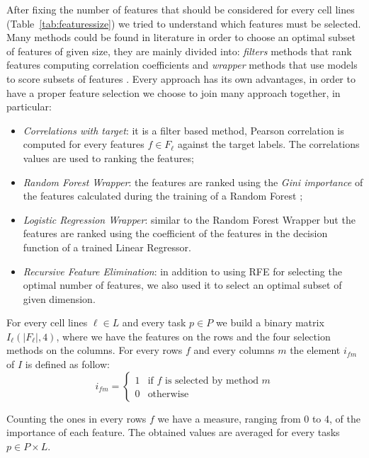 After fixing the number of features that should be considered for every cell lines (Table~\ref{tab:featuressize}) we tried to understand which features must be selected. Many methods could be found in literature in order to choose an optimal subset of features of given size, they are mainly divided into: \emph{filters} methods that rank features computing correlation coefficients and \emph{wrapper} methods that use models to score subsets of features \cite{Guyon}. Every approach has its own advantages, in order to have a proper feature selection we choose to join many approach together, in particular: 
\begin{itemize}
    \item \textit{Correlations with target}: it is a filter based method, Pearson correlation is computed for every features $f \in F_\ell$ against the target labels. The correlations values are used to ranking the features;
    \item \textit{Random Forest Wrapper}: the features are ranked using the \emph{Gini importance} \cite{giniimportance} of the features calculated during the training of a Random Forest \cite{breiman2001random}; 
    \item \textit{Logistic Regression Wrapper}: similar to the Random Forest Wrapper but the features are ranked using the coefficient of the features in the decision function of a trained Linear Regressor.
    \item \emph{Recursive Feature Elimination}: in addition to using RFE for selecting the optimal number of features, we also used it to select an optimal subset of given dimension. 
\end{itemize}
For every cell lines $\ell \in L$ and every task $p \in P$ we build a binary matrix $I_\ell(|F_\ell|, 4)$, where we have the features on the rows and the four selection methods on the columns. For every rows $f$ and every columns $m$ the element $i_{fm}$ of $I$ is defined as follow: 
\[
    i_{fm} = \begin{cases} 1 & \mbox{if } f \mbox{ is selected by method } m \\ 0 & \mbox{otherwise} \end{cases}
\]

Counting the ones in every rows $f$ we have a measure, ranging from 0 to 4, of the importance of each feature. The obtained values are averaged for every tasks $p \in P \times L$. 

